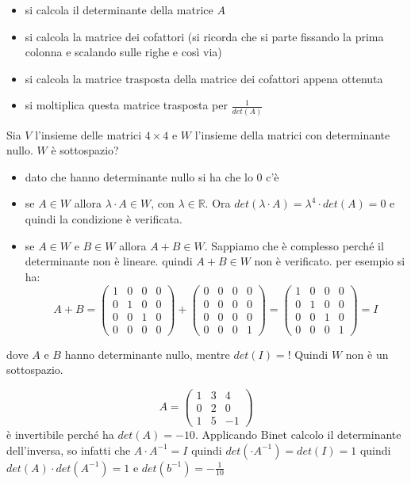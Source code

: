 \documentclass[a4paper,12pt, oneside]{book}
\begin{document}
\begin{itemize}
\item si calcola il determinante della matrice $A$
\item si calcola la matrice dei cofattori (si ricorda che si parte fissando la prima colonna e scalando sulle righe e così via)
\item si calcola la matrice trasposta della matrice dei cofattori appena ottenuta
\item si moltiplica questa matrice trasposta per $\frac{1}{det(A)}$
\end{itemize}
\newpage
\begin{esercizio}
Sia $V$ l'insieme delle matrici $4\times 4$ e $W$ l'insieme della matrici con determinante nullo. $W$ è sottospazio?
\begin{itemize}
\item dato che hanno determinante nullo si ha che lo 0 c'è
\item se $A\in W$ allora $\lambda\cdot A\in W$, con $\lambda\in \mathbb{R}$. Ora $det(\lambda\cdot A)=\lambda^4 \cdot det(A)=0$ e quindi la condizione è verificata.
\item se $A\in W$ e $B\in W$ allora $A+B\in W$. Sappiamo che è complesso perché il determinante non è lineare. quindi $A+B\in W$ non è verificato. per esempio si ha:
$$
A+B=
\left(\begin{matrix}
1 & 0 & 0 & 0\\
0 & 1 & 0 & 0\\
0 & 0 & 1 & 0\\
0 & 0 & 0 & 0
\end{matrix}\right)+\left(\begin{matrix}
0 & 0 & 0 & 0\\
0 & 0 & 0 & 0\\
0 & 0 & 0 & 0\\
0 & 0 & 0 & 1
\end{matrix}\right)=\left(\begin{matrix}
1 & 0 & 0 & 0\\
0 & 1 & 0 & 0\\
0 & 0 & 1 & 0\\
0 & 0 & 0 & 1
\end{matrix}\right)=I
$$
\end{itemize}
dove $A$ e $B$ hanno determinante nullo, mentre $det(I)=!$
Quindi $W$ non è un sottospazio.
\end{esercizio}
\begin{esercizio}
$$
A=\left(\begin{matrix}
1 & 3 & 4\\
0 & 2 & 0\\
1 & 5 & -1
\end{matrix}\right)
$$
è invertibile perché ha $det(A)=-10$. Applicando Binet calcolo il determinante dell'inversa, so infatti che $A\cdot A^{-1}=I$ quindi $det(\cdot A^{-1})=det(I)=1$ quindi $det(A)\cdot det(A^{-1})=1$ e $det(b^{-1})=-\frac{1}{10}$
\end{esercizio}
\newpage
\end{document}
